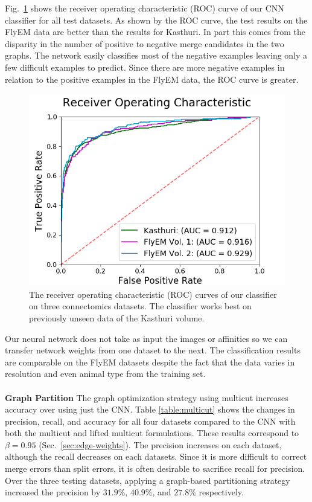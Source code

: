Fig.~\ref{fig:receiver-operating-characteristic} shows the receiver operating characteristic (ROC) curve of our CNN classifier for all test datasets.
As shown by the ROC curve, the test results on the FlyEM data are better than the results for Kasthuri.
In part this comes from the disparity in the number of positive to negative merge candidates in the two graphs. 
The network easily classifies most of the negative examples leaving only a few difficult examples to predict.
Since there are more negative examples in relation to the positive examples in the FlyEM data, the ROC curve is greater.


\begin{figure}
	\centering
	\includegraphics[width=0.45\linewidth]{./figures/receiver-operating-characteristic.png}
	\caption{The receiver operating characteristic (ROC) curves of our classifier on three connectomics datasets. The classifier works best on previously unseen data of the Kasthuri volume.}
	\label{fig:receiver-operating-characteristic}
\end{figure}

Our neural network does not take as input the images or affinities so we can transfer network weights from one dataset to the next.
The classification results are comparable on the FlyEM datasets despite the fact that the data varies in resolution and even animal type from the training set.
\\~\\
\noindent\textbf{Graph Partition}
The graph optimization strategy using multicut increases accuracy over using just the CNN.
Table \ref{table:multicut} shows the changes in precision, recall, and accuracy for all four datasets compared to the CNN with both the multicut and lifted multicut formulations.
These results correspond to $\beta = 0.95$ (Sec.~\ref{sec:edge-weights}). 
The precision increases on each dataset, although the recall decreases on each datasets.
Since it is more difficult to correct merge errors than split errors, it is often desirable to sacrifice recall for precision.
Over the three testing datasets, applying a graph-based partitioning strategy increased the precision by $31.9\%$, $40.9\%$, and $27.8\%$ respectively. 

